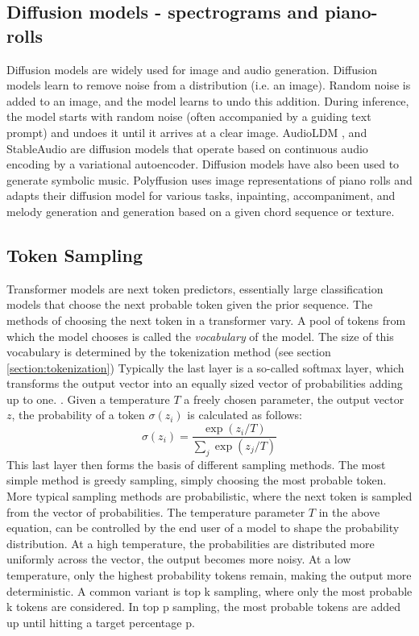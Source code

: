 \subsection{Diffusion models - spectrograms and piano-rolls}
Diffusion models are widely used for image and audio generation. Diffusion models learn to remove noise from a distribution (i.e. an image). Random noise is added to an image, and the model learns to undo this addition. During inference, the model starts with random noise (often accompanied by a guiding text prompt) and undoes it until it arrives at a clear image. AudioLDM \cite{Liu_Chen_Yuan_Mei_Liu_Mandic_Wang_Plumbley_2023}, and StableAudio \cite{Evans_Parker_Carr_Zukowski_Taylor_Pons_2024} are diffusion models that operate based on continuous audio encoding by a variational autoencoder. Diffusion models have also been used to generate symbolic music. Polyffusion \cite{Min_Jiang_Xia_Zhao_polyffusion_2023} uses image representations of piano rolls and adapts their diffusion model for various tasks, inpainting, accompaniment, and melody generation and generation based on a given chord sequence or texture. 

\subsection{Token Sampling} \label{section:token_sampling}
Transformer models are next token predictors, essentially large classification models that choose the next probable token given the prior sequence. The methods of choosing the next token in a transformer vary. A pool of tokens from which the model chooses is called the \textit{vocabulary} of the model. The size of this vocabulary is determined by the tokenization method (see section \ref{section:tokenization}) Typically the last layer is a so-called softmax layer, which transforms the output vector into an equally sized vector of probabilities adding up to one. \cite{Radford_Wu_Child_Luan_gpt2_2019}. Given a temperature $T$ a freely chosen parameter, the output vector $z$, the probability of a token $\sigma(z_i)$ is calculated as follows: 
\begin{equation}
\sigma(z_i) = \frac{\exp(z_i / T)}{\sum_{j} \exp(z_j / T)}
\end{equation}
This last layer then forms the basis of different sampling methods. The most simple method is greedy sampling, simply choosing the most probable token. More typical sampling methods are probabilistic, where the next token is sampled from the vector of probabilities. The temperature parameter $T$ in the above equation, can be controlled by the end user of a model to shape the probability distribution. At a high temperature, the probabilities are distributed more uniformly across the vector, the output becomes more noisy. At a low temperature, only the highest probability tokens remain, making the output more deterministic. 
A common variant is top k sampling, where only the most probable k tokens are considered. In top p sampling, the most probable tokens are added up until hitting a target percentage p. 


